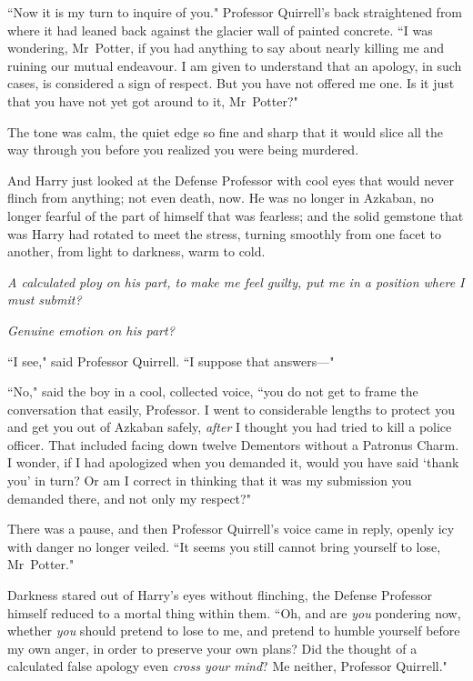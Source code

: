 ``Now it is my turn to inquire of you." Professor Quirrell's back straightened from where it had leaned back against the glacier wall of painted concrete. ``I was wondering, Mr~Potter, if you had anything to say about nearly killing me and ruining our mutual endeavour. I am given to understand that an apology, in such cases, is considered a sign of respect. But you have not offered me one. Is it just that you have not yet got around to it, Mr~Potter?"

The tone was calm, the quiet edge so fine and sharp that it would slice all the way through you before you realized you were being murdered.

And Harry just looked at the Defense Professor with cool eyes that would never flinch from anything; not even death, now. He was no longer in Azkaban, no longer fearful of the part of himself that was fearless; and the solid gemstone that was Harry had rotated to meet the stress, turning smoothly from one facet to another, from light to darkness, warm to cold.

\emph{A calculated ploy on his part, to make me feel guilty, put me in a position where I must submit?}

\emph{Genuine emotion on his part?}

``I see," said Professor Quirrell. ``I suppose that answers—"

``No," said the boy in a cool, collected voice, ``you do not get to frame the conversation that easily, Professor. I went to considerable lengths to protect you and get you out of Azkaban safely, \emph{after} I thought you had tried to kill a police officer. That included facing down twelve Dementors without a Patronus Charm. I wonder, if I had apologized when you demanded it, would you have said `thank you' in turn? Or am I correct in thinking that it was my submission you demanded there, and not only my respect?"

There was a pause, and then Professor Quirrell's voice came in reply, openly icy with danger no longer veiled. ``It seems you still cannot bring yourself to lose, Mr~Potter."

Darkness stared out of Harry's eyes without flinching, the Defense Professor himself reduced to a mortal thing within them. ``Oh, and are \emph{you} pondering now, whether \emph{you} should pretend to lose to me, and pretend to humble yourself before my own anger, in order to preserve your own plans? Did the thought of a calculated false apology even \emph{cross your mind}? Me neither, Professor Quirrell."

